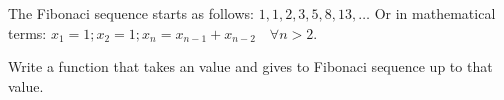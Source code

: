 \begin{Exercise}[title={Fibonaci},difficulty=5]
\label{ex:fibonaci}
The Fibonaci sequence starts as follows: $1, 1, 2, 3, 5, 8, 13, \ldots$
Or in mathematical terms: $ x_1 = 1; x_2 = 1; x_n = x_{n-1} +
x_{n-2}\quad\forall n > 2 $.

\Question\label{ex:fibonaci q1}Write a function that takes an  value and gives to
Fibonaci sequence up to that value.

\end{Exercise}

\begin{Answer}
\Question

\end{Answer}


